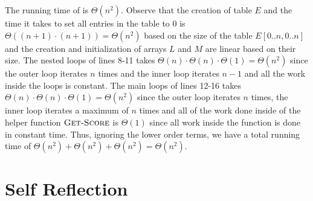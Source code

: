\documentclass[11pt]{article}
\theoremstyle{nonumberplain}
\begin{document}
\begin{enumerate}
  The running time of  is $\Theta(n^2)$. Observe that the creation of table $E$ and the time it takes to set all entries in the table to 0 is $\Theta((n+1) \cdot (n+1))=\Theta(n^2)$ based on the size of the table $E[0..n,0..n]$ and the creation and initialization of arrays $L$ and $M$ are linear based on their size. The nested loops of lines 8-11 takes $\Theta(n) \cdot \Theta(n) \cdot \Theta(1)=\Theta(n^2)$ since the outer loop iterates $n$ times and the inner loop iterates $n-1$ and all the work inside the loops is constant. The main loops of lines 12-16 takes $\Theta(n) \cdot \Theta(n) \cdot \Theta(1)=\Theta(n^2)$ since the outer loop iterates $n$ times, the inner loop iterates a maximum of $n$ times and all of the work done inside of the helper function $\textnormal{\scshape Get-Score}$ is $\Theta(1)$ since all work inside the function is done in constant time. Thus, ignoring the lower order terms, we have a total running time of $\Theta(n^2)+\Theta(n^2)+\Theta(n^2)=\Theta(n^2)$.  
\end{enumerate}

\section*{Self Reflection}
\end{document}
